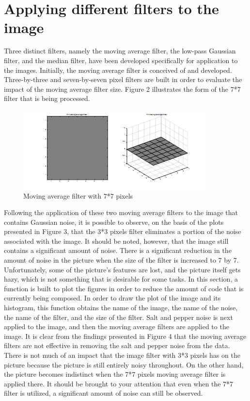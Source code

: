 \section{Applying different filters to the image}\label{P2}

Three distinct filters, namely the moving average filter, the low-pass Gaussian filter, and the median filter, have been developed specifically for application to the images. Initially, the moving average filter is conceived of and developed. Three-by-three and seven-by-seven pixel filters are built in order to evaluate the impact of the moving average filter size. Figure 2 illustrates the form of the 7*7 filter that is being processed.


\begin{figure} [ht]
    \centering
    \includegraphics[scale = 1.5, angle=0]{Resources/Avg_filter.png}
    \caption{Moving average filter with 7*7 pixels}
    \label{fig:ApplyingFilters}
\end{figure}

Following the application of these two moving average filters to the image that contains Gaussian noise, it is possible to observe, on the basis of the plots presented in Figure 3, that the 3*3 pixels filter eliminates a portion of the noise associated with the image. It should be noted, however, that the image still contains a significant amount of noise. There is a significant reduction in the amount of noise in the picture when the size of the filter is increased to 7 by 7. Unfortunately, some of the picture's features are lost, and the picture itself gets hazy, which is not something that is desirable for some tasks. In this section, a function is built to plot the figures in order to reduce the amount of code that is currently being composed. In order to draw the plot of the image and its histogram, this function obtains the name of the image, the name of the noise, the name of the filter, and the size of the filter. 
Salt and pepper noise is next applied to the image, and then the moving average filters are applied to the image. It is clear from the findings presented in Figure 4 that the moving average filters are not effective in removing the salt and pepper noise from the data. There is not much of an impact that the image filter with 3*3 pixels has on the picture because the picture is still entirely noisy throughout. On the other hand, the picture becomes indistinct when the 7*7 pixels moving average filter is applied there. It should be brought to your attention that even when the 7*7 filter is utilized, a significant amount of noise can still be observed.

